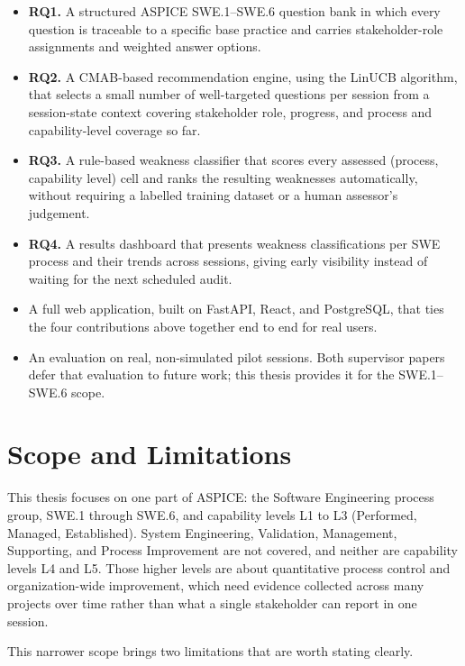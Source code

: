 \documentclass[a4paper, 12pt, oneside, openany, BCOR1cm,toc=chapterentrywithdots]{scrbook}
\begin{document}
\begin{itemize}
  \item \textbf{RQ1.} A structured ASPICE SWE.1--SWE.6 question bank in which every question is
  traceable to a specific base practice and carries stakeholder-role assignments and weighted
  answer options.
  \item \textbf{RQ2.} A CMAB-based recommendation engine, using the LinUCB algorithm, that
  selects a small number of well-targeted questions per session from a session-state context
  covering stakeholder role, progress, and process and capability-level coverage so far.
  \item \textbf{RQ3.} A rule-based weakness classifier that scores every assessed (process,
  capability level) cell and ranks the resulting weaknesses automatically, without requiring a
  labelled training dataset or a human assessor's judgement.
  \item \textbf{RQ4.} A results dashboard that presents weakness classifications per SWE process
  and their trends across sessions, giving early visibility instead of waiting for the next
  scheduled audit.
  \item A full web application, built on FastAPI, React, and PostgreSQL, that ties the four
  contributions above together end to end for real users.
  \item An evaluation on real, non-simulated pilot sessions. Both supervisor
  papers~\cite{datsogiannis2024early,datsogiannis2025recommender} defer that evaluation to
  future work; this thesis provides it for the SWE.1--SWE.6 scope.
\end{itemize}

\section{Scope and Limitations}

This thesis focuses on one part of ASPICE: the Software Engineering process group, SWE.1 through
SWE.6, and capability levels L1 to L3 (Performed, Managed, Established). System Engineering,
Validation, Management, Supporting, and Process Improvement are not covered, and neither are
capability levels L4 and L5. Those higher levels are about quantitative process control and
organization-wide improvement, which need evidence collected across many projects over time
rather than what a single stakeholder can report in one session.

This narrower scope brings two limitations that are worth stating clearly.
\end{document}
